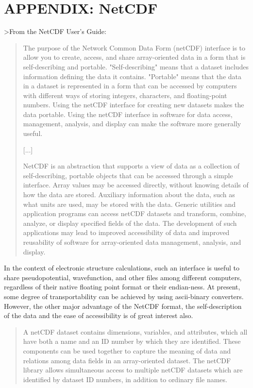 \documentclass[11pt]{article}
\begin{document}
\newpage
\section{APPENDIX: NetCDF}
>From the NetCDF User's Guide:

\begin{quotation}
   The purpose of the Network Common Data Form (netCDF) interface is to
   allow you to create, access, and share array-oriented data in a form
   that is self-describing and portable. "Self-describing" means that a
   dataset includes information defining the data it contains. "Portable"
   means that the data in a dataset is represented in a form that can be
   accessed by computers with different ways of storing integers,
   characters, and floating-point numbers. Using the netCDF interface for
   creating new datasets makes the data portable. Using the netCDF
   interface in software for data access, management, analysis, and
   display can make the software more generally useful.

   [...]

   NetCDF is an abstraction that supports a view of data as a collection
   of self-describing, portable objects that can be accessed through a
   simple interface. Array values may be accessed directly, without
   knowing details of how the data are stored. Auxiliary information
   about the data, such as what units are used, may be stored with the
   data. Generic utilities and application programs can access netCDF
   datasets and transform, combine, analyze, or display specified fields
   of the data. The development of such applications may lead to improved
   accessibility of data and improved reusability of software for
   array-oriented data management, analysis, and display.

\end{quotation}

In the context of electronic structure calculations, such an interface
is useful to share pseudopotential, wavefunction, and other
files among different computers, regardless of their native floating
point format or their endian-ness. At present, some degree of
transportability can be achieved by using ascii-binary converters.
However, the other major advantage of the
NetCDF format, the self-description of the data and the ease of
accessibility is of great interest also.

\begin{quotation}
   A netCDF dataset contains dimensions, variables, and attributes, which
   all have both a name and an ID number by which they are identified.
   These components can be used together to capture the meaning of data
   and relations among data fields in an array-oriented dataset. The
   netCDF library allows simultaneous access to multiple netCDF datasets
   which are identified by dataset ID numbers, in addition to ordinary
   file names.
\end{quotation}
\end{document}
